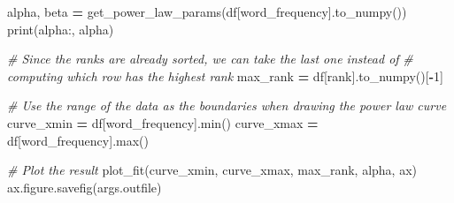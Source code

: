 \documentclass[
]{krantz}
\makeatletter
\newenvironment{Shaded}{\begin{snugshade}}{\end{snugshade}}
\newcommand{\BuiltInTok}[1]{#1}
\newcommand{\CommentTok}[1]{\textcolor[rgb]{0.56,0.35,0.01}{\textit{#1}}}
\newcommand{\DecValTok}[1]{\textcolor[rgb]{0.00,0.00,0.81}{#1}}
\newcommand{\NormalTok}[1]{#1}
\newcommand{\OperatorTok}[1]{\textcolor[rgb]{0.81,0.36,0.00}{\textbf{#1}}}
\newcommand{\StringTok}[1]{\textcolor[rgb]{0.31,0.60,0.02}{#1}}
\newenvironment{kframe}{%
\medskip{}
\setlength{\fboxsep}{.8em}
 \def\at@end@of@kframe{}%
 \ifinner\ifhmode%
  \def\at@end@of@kframe{\end{minipage}}%
  \begin{minipage}{\columnwidth}%
 \fi\fi%
 \def\FrameCommand##1{\hskip\@totalleftmargin \hskip-\fboxsep
 \colorbox{shadecolor}{##1}\hskip-\fboxsep
     \hskip-\linewidth \hskip-\@totalleftmargin \hskip\columnwidth}%
 \MakeFramed {\advance\hsize-\width
   \@totalleftmargin\z@ \linewidth\hsize
   \@setminipage}}%
 {\par\unskip\endMakeFramed%
 \at@end@of@kframe}
\renewenvironment{Shaded}{\begin{kframe}}{\end{kframe}}
\makeatother
\begin{document}
\begin{Shaded}
\begin{Highlighting}[]
\NormalTok{    alpha, beta }\OperatorTok{=}\NormalTok{ get\_power\_law\_params(df[}\StringTok{\textquotesingle{}word\_frequency\textquotesingle{}}\NormalTok{].to\_numpy())}
    \BuiltInTok{print}\NormalTok{(}\StringTok{\textquotesingle{}alpha:\textquotesingle{}}\NormalTok{, alpha)}

    \CommentTok{\# Since the ranks are already sorted, we can take the last one instead of}
    \CommentTok{\# computing which row has the highest rank}
\NormalTok{    max\_rank }\OperatorTok{=}\NormalTok{ df[}\StringTok{\textquotesingle{}rank\textquotesingle{}}\NormalTok{].to\_numpy()[}\OperatorTok{{-}}\DecValTok{1}\NormalTok{]}

    \CommentTok{\# Use the range of the data as the boundaries when drawing the power law curve}
\NormalTok{    curve\_xmin }\OperatorTok{=}\NormalTok{ df[}\StringTok{\textquotesingle{}word\_frequency\textquotesingle{}}\NormalTok{].}\BuiltInTok{min}\NormalTok{()}
\NormalTok{    curve\_xmax }\OperatorTok{=}\NormalTok{ df[}\StringTok{\textquotesingle{}word\_frequency\textquotesingle{}}\NormalTok{].}\BuiltInTok{max}\NormalTok{()}

    \CommentTok{\# Plot the result}
\NormalTok{    plot\_fit(curve\_xmin, curve\_xmax, max\_rank, alpha, ax)}
\NormalTok{    ax.figure.savefig(args.outfile)}



\end{Highlighting}
\end{Shaded}
\end{document}
